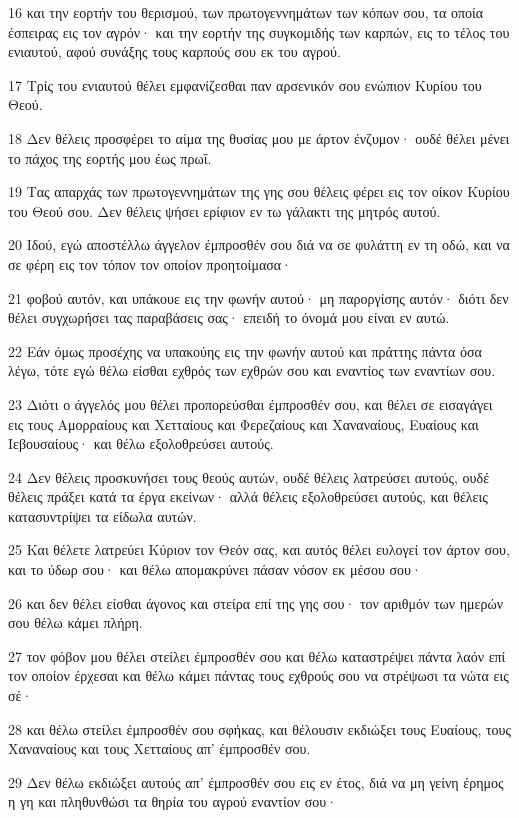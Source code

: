 \par 16 και την εορτήν του θερισμού, των πρωτογεννημάτων των κόπων σου, τα οποία έσπειρας εις τον αγρόν· και την εορτήν της συγκομιδής των καρπών, εις το τέλος του ενιαυτού, αφού συνάξης τους καρπούς σου εκ του αγρού.
\par 17 Τρίς του ενιαυτού θέλει εμφανίζεσθαι παν αρσενικόν σου ενώπιον Κυρίου του Θεού.
\par 18 Δεν θέλεις προσφέρει το αίμα της θυσίας μου με άρτον ένζυμον· ουδέ θέλει μένει το πάχος της εορτής μου έως πρωΐ.
\par 19 Τας απαρχάς των πρωτογεννημάτων της γης σου θέλεις φέρει εις τον οίκον Κυρίου του Θεού σου. Δεν θέλεις ψήσει ερίφιον εν τω γάλακτι της μητρός αυτού.
\par 20 Ιδού, εγώ αποστέλλω άγγελον έμπροσθέν σου διά να σε φυλάττη εν τη οδώ, και να σε φέρη εις τον τόπον τον οποίον προητοίμασα·
\par 21 φοβού αυτόν, και υπάκουε εις την φωνήν αυτού· μη παροργίσης αυτόν· διότι δεν θέλει συγχωρήσει τας παραβάσεις σας· επειδή το όνομά μου είναι εν αυτώ.
\par 22 Εάν όμως προσέχης να υπακούης εις την φωνήν αυτού και πράττης πάντα όσα λέγω, τότε εγώ θέλω είσθαι εχθρός των εχθρών σου και εναντίος των εναντίων σου.
\par 23 Διότι ο άγγελός μου θέλει προπορεύσθαι έμπροσθέν σου, και θέλει σε εισαγάγει εις τους Αμορραίους και Χετταίους και Φερεζαίους και Χαναναίους, Ευαίους και Ιεβουσαίους· και θέλω εξολοθρεύσει αυτούς.
\par 24 Δεν θέλεις προσκυνήσει τους θεούς αυτών, ουδέ θέλεις λατρεύσει αυτούς, ουδέ θέλεις πράξει κατά τα έργα εκείνων· αλλά θέλεις εξολοθρεύσει αυτούς, και θέλεις κατασυντρίψει τα είδωλα αυτών.
\par 25 Και θέλετε λατρεύει Κύριον τον Θεόν σας, και αυτός θέλει ευλογεί τον άρτον σου, και το ύδωρ σου· και θέλω απομακρύνει πάσαν νόσον εκ μέσου σου·
\par 26 και δεν θέλει είσθαι άγονος και στείρα επί της γης σου· τον αριθμόν των ημερών σου θέλω κάμει πλήρη.
\par 27 τον φόβον μου θέλει στείλει έμπροσθέν σου και θέλω καταστρέψει πάντα λαόν επί τον οποίον έρχεσαι και θέλω κάμει πάντας τους εχθρούς σου να στρέψωσι τα νώτα εις σέ·
\par 28 και θέλω στείλει έμπροσθέν σου σφήκας, και θέλουσιν εκδιώξει τους Ευαίους, τους Χαναναίους και τους Χετταίους απ' έμπροσθέν σου.
\par 29 Δεν θέλω εκδιώξει αυτούς απ' έμπροσθέν σου εις εν έτος, διά να μη γείνη έρημος η γη και πληθυνθώσι τα θηρία του αγρού εναντίον σου·

